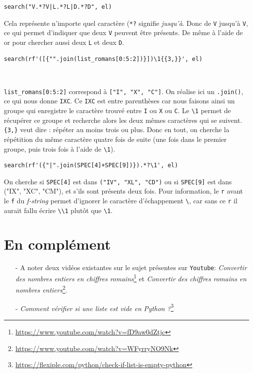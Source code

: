 \begin{verbatim}
search("V.*?V|L.*?L|D.*?D", el)
\end{verbatim}
\medskip

Cela représente n'importe quel caractère (\texttt{*?} signifie \og \textit{jusqu'à}\fg{}. Donc de \texttt{V} jusqu'à \texttt{V}, ce qui permet d'indiquer que deux \texttt{V} peuvent être présents. De même à l'aide de \og or\fg{} pour chercher aussi deux \texttt{L} et deux \texttt{D}.
\medskip

\begin{verbatim}
search(rf'([{"".join(list_romans[0:5:2])}])\1{{3,}}', el)
\end{verbatim} ‎
\medskip

\texttt{list\_romans[0:5:2]} correspond à \texttt{["I", "X", "C"]}. On réalise  ici un \texttt{.join()}, ce qui nous donne \texttt{IXC}. Ce \texttt{IXC} est entre parenthèses car nous faisons ainsi un groupe qui enregistre le caractère trouvé entre \texttt{I} ou \texttt{X} ou \texttt{C}. Le \texttt{\textbackslash{}1} permet de récupérer ce groupe et recherche alors les deux mêmes caractères qui se suivent. \texttt{\{3,\}} veut dire : répéter au moins trois ou plus. Donc en tout, on cherche la répétition du même caractère quatre fois de suite (une fois dans le premier groupe, puis trois fois à l'aide de \texttt{\textbackslash{}1}).
\medskip

\begin{verbatim}
search(rf'({"|".join(SPEC[4]+SPEC[9])}).*?\1', el)
\end{verbatim}
\medskip

On cherche si \texttt{SPEC[4]} est dans \texttt{("IV", "XL", "CD")} ou si \texttt{SPEC[9]} est dans ("IX", "XC", "CM"), et s'ils sont présents deux fois. Pour information, le \texttt{r} avant le \texttt{f} du \textit{f-string} permet d'ignorer le caractère d'échappement \og \texttt{\textbackslash{}}\fg{}, car sans ce \texttt{r} il aurait fallu écrire \og \texttt{\textbackslash{}\textbackslash{}1}\fg{} plutôt que \og \texttt{\textbackslash{}1}\fg{}.
\medskip

\section{En complément}
\begin{itemize}
	\item[-] A noter deux vidéos existantes sur le sujet présentes sur \texttt{Youtube}: \textit{Convertir des nombres entiers en chiffres romains}\footnote{\url{https://www.youtube.com/watch?v=fD9aw0dZtjc}} et \textit{Convertir des chiffres romains en nombres entiers}\footnote{\url{https://www.youtube.com/watch?v=WFyrryNO9Nk}}.
	\item[-] \textit{Comment vérifier si une liste est vide en Python ?}\footnote{\url{https://flexiple.com/python/check-if-list-is-empty-python}}
\end{itemize}
\medskip

